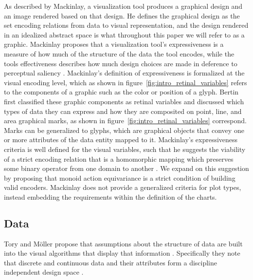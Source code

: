 \documentclass[../main.tex]{subfiles}
\begin{document}
As described by Mackinlay, a visualization tool produces a graphical design and an image rendered based on that design. He defines the graphical design as the set encoding relations from data to visual representation\cite{mackinlayAutomatingDesignGraphical1986}, and the design rendered in an idealized abstract space is what throughout this paper we will refer to as a graphic. Mackinlay  proposes that a visualization tool's expressiveness is a measure of how much of the structure of the data the tool encodes, while the tools effectiveness describes how much design choices are made in deference to perceptual saliency \cite{clevelandResearchStatisticalGraphics1987,clevelandGraphicalPerceptionTheory1984,chambersGraphicalMethodsData1983a, munznerVisualizationAnalysisDesign2014}. Mackinlay's definition of expressiveness is formalized at the visual encoding level, which as shown in figure~\ref{fig:intro_retinal_variables} refers to the components of a graphic such as the color or position of a glyph. Bertin first classified these graphic components as retinal variables and discussed which types of data they can express \cite{bertinIIPropertiesGraphic2011} and how they are composited on point, line, and area graphical marks, as shown in figure~\ref{fig:intro_retinal_variables} correspond. Marks can be generalized to glyphs, which are graphical objects that convey one or more attributes of the data entity mapped to it\cite{ware2019information, munznerVisualizationAnalysisDesign2014}. Mackinlay's expressiveness criteria is well defined for the visual variables, such that he suggests the viability of a strict encoding relation that is a homomorphic mapping which preserves some binary operator from one domain to another \cite{mackinlayAUTOMATICDESIGNGRAPHICAL1987}. We expand on this suggestion by proposing that monoid action equivariance is a strict condition of building valid encoders. Mackinlay does not provide a generalized criteria for plot types, instead embedding the requirements within the definition of the charts. 


\subsection{Data}
\label{sec:intro_data}
Tory and Möller propose that assumptions about the structure of data are built into the visual algorithms that display that information \cite{toryRethinkingVisualizationHighLevel2004}. Specifically they note that discrete and continuous data and their attributes form a discipline independent design space \cite{pousmanCasualInformation2007}. 
\end{document}
